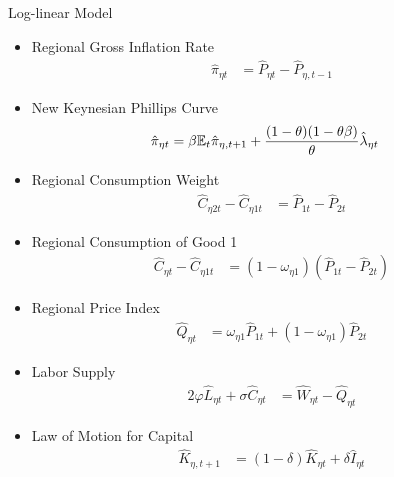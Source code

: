 \documentclass[../quali_slides.tex]{subfiles}
\begin{document}
\begin{frame}[allowframebreaks]{Log-linear Model}
	
{\singlespacing
		
	\begin{itemize}
		
		\item Regional Gross Inflation Rate
		\begin{align}
			\hat{\pi}_{\eta t} &= \hat{P}_{\eta t} - \hat{P}_{\eta, t-1} \label{eq_v2:level-dev-regional-inflation}
		\end{align}
		
		\item New Keynesian Phillips Curve
		\begin{align}
			\hat{\pi}_{\eta t} &= \beta {\mathbb{E}_{t}} \hat{\pi}_{\eta, t+1} + \frac{(1-\theta) (1- \theta \beta)}{\theta} \hat{\lambda}_{\eta t} \label{eq_v2:reg-nk-phillips-curve-mc}
		\end{align}
		
		\item Regional Consumption Weight
		\begin{align}
			\hat{C}_{\eta 2t} - \hat{C}_{\eta 1t} &= \hat{P}_{1t} - \hat{P}_{2t} \label{eq_v2:reg-C-eta-12-t-ll}
		\end{align}
		
		\item Regional Consumption of Good 1
		\begin{align}
			\hat{C}_{\eta t} - \hat{C}_{\eta 1 t} &= (1 - \omega_{\eta 1}) (\hat{P}_{1t} - \hat{P}_{2t}) \label{eq_v2:reg-C-eta-1-t-ll}
		\end{align}
		
		\item Regional Price Index
		\begin{align}
			\hat{Q}_{\eta t} &= \omega_{\eta 1} \hat{P}_{1 t} + (1 -\omega_{\eta 1}) \hat{P}_{2 t} \label{eq_v2:reg-total-expense-level-ll}
		\end{align}
		
		\item Labor Supply
		\begin{alignat}{2}
			\varphi \hat{L}_{\eta t} + \sigma \hat{C}_{\eta t} &= \hat{W}_{\eta t} - \hat{Q}_{\eta t} \label{eq_v2:reg-ll-labor-supply}
		\end{alignat}
		
		\item Law of Motion for Capital
		\begin{align}
			\hat{K}_{\eta, t+1} &= (1-\delta) \hat{K}_{\eta t} + \delta \hat{I}_{\eta t} \label{eq_v2:reg-ll-law-of-motion-for-capital}
		\end{align}
		

\end{itemize}}
\end{frame}
\end{document}
